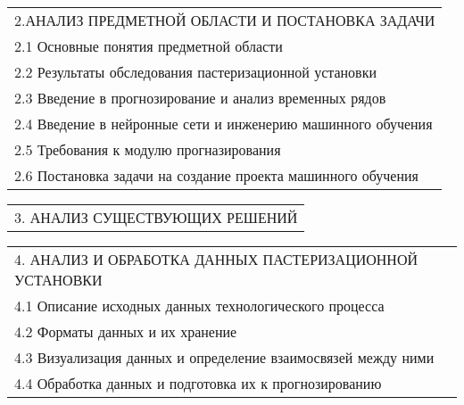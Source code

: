 \documentclass[12pt, А4, twoside]{article} %
\begin{document}
\begin{FlushLeft}
    \begin{tabular}{p{17.25cm}}
        \textsf{2.АНАЛИЗ ПРЕДМЕТНОЙ ОБЛАСТИ И ПОСТАНОВКА ЗАДАЧИ} \vspace{1pt} \hline \\
        \hspace{0.3cm}\textsf{2.1 Основные понятия предметной области} \vspace{1pt} \hline \\
        \hspace{0.3cm}\textsf{2.2 Результаты обследования пастеризационной установки} \vspace{1pt} \hline \\
        \hspace{0.3cm}\textsf{2.3 Введение в прогнозирование и анализ временных рядов} \vspace{1pt} \hline \\
        \hspace{0.3cm}\textsf{2.4 Введение в нейронные сети и инженерию машинного обучения} \vspace{1pt} \hline \\
        \hspace{0.3cm}\textsf{2.5 Требования к модулю прогназирования} \vspace{1pt} \hline \\
        \hspace{0.3cm}\textsf{2.6 Постановка задачи на создание проекта машинного обучения} \vspace{1pt} \hline \\
    \end{tabular}  

    \begin{tabular}{p{17.25cm}} 
        \textsf{3. АНАЛИЗ СУЩЕСТВУЮЩИХ РЕШЕНИЙ} \vspace{1pt} \hline \\
    \end{tabular} 

    \begin{tabular}{p{17.25cm}} 
        \textsf{4. АНАЛИЗ И ОБРАБОТКА ДАННЫХ ПАСТЕРИЗАЦИОННОЙ УСТАНОВКИ} \vspace{1pt} \hline \\
        \hspace{0.3cm}\textsf{4.1 Описание исходных данных технологического процесса} \vspace{1pt} \hline \\
        \hspace{0.3cm}\textsf{4.2 Форматы данных и их хранение} \vspace{1pt} \hline \\
        \hspace{0.3cm}\textsf{4.3 Визуализация данных и определение взаимосвязей между ними} \vspace{1pt} \hline \\
        \hspace{0.3cm}\textsf{4.4 Обработка данных и подготовка их к прогнозированию} \vspace{1pt} \hline \\
    \end{tabular}    


\end{FlushLeft}
\end{document}
